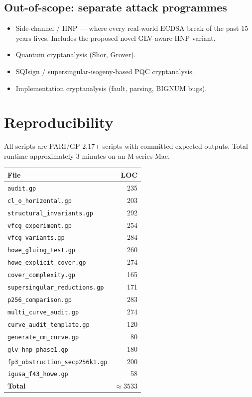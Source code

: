 \documentclass[11pt,a4paper]{article}
\theoremstyle{definition}
\begin{document}
\subsection*{Out-of-scope: separate attack programmes}
\begin{itemize}
\item Side-channel / HNP --- where every real-world ECDSA break of
      the past 15 years lives. Includes the proposed novel
      GLV-aware HNP variant.
\item Quantum cryptanalysis (Shor, Grover).
\item SQIsign / supersingular-isogeny-based PQC cryptanalysis.
\item Implementation cryptanalysis (fault, parsing, BIGNUM bugs).
\end{itemize}

\section{Reproducibility}

All scripts are PARI/GP 2.17+ scripts with committed expected
outputs. Total runtime approximately 3 minutes on an M-series Mac.

\begin{center}
\small
\begin{tabular}{lr}
\toprule
File & LOC \\
\midrule
\texttt{audit.gp} & 235 \\
\texttt{cl\_o\_horizontal.gp} & 203 \\
\texttt{structural\_invariants.gp} & 292 \\
\texttt{vfcg\_experiment.gp} & 254 \\
\texttt{vfcg\_variants.gp} & 284 \\
\texttt{howe\_gluing\_test.gp} & 260 \\
\texttt{howe\_explicit\_cover.gp} & 274 \\
\texttt{cover\_complexity.gp} & 165 \\
\texttt{supersingular\_reductions.gp} & 171 \\
\texttt{p256\_comparison.gp} & 283 \\
\texttt{multi\_curve\_audit.gp} & 274 \\
\texttt{curve\_audit\_template.gp} & 120 \\
\texttt{generate\_cm\_curve.gp} & 80 \\
\texttt{glv\_hnp\_phase1.gp} & 180 \\
\texttt{fp3\_obstruction\_secp256k1.gp} & 200 \\
\texttt{igusa\_f43\_howe.gp} & 58 \\
\midrule
\textbf{Total} & \textbf{$\approx 3533$} \\
\bottomrule
\end{tabular}
\end{center}
\end{document}
